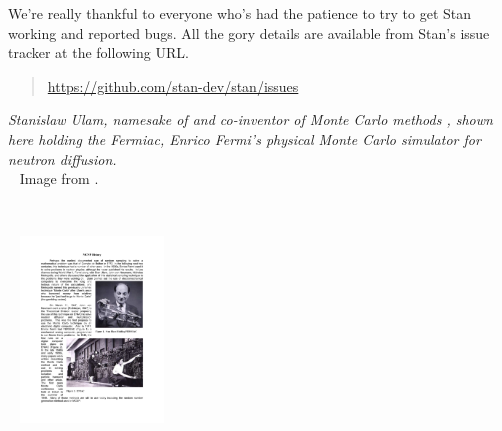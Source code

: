 We're really thankful to everyone who's had the patience to try
to get Stan working and reported bugs.  All the gory details are
available from Stan's issue tracker at the following URL.
%
\begin{quote}
\url{https://github.com/stan-dev/stan/issues}
\end{quote}




\vfill
\begin{center}
\hfill
\begin{minipage}[b]{2in}
  \footnotesize {\it Stanislaw Ulam, namesake of \Stan and co-inventor
    of Monte Carlo methods \citep{MetropolisUlam:1949}, shown here
    holding the Fermiac, Enrico Fermi's physical Monte Carlo simulator
    for neutron diffusion.}
  \\[3pt] \mbox{ } \hfill
  {\scriptsize Image from \citep{Giesler:2000}.}
\end{minipage} \ \ \ \ \
\begin{minipage}[b]{1.5in} \mbox{ } \hfill
  \includegraphics[width=1.5in]{img/ulam-fermiac.pdf}
\end{minipage}
\end{center}

